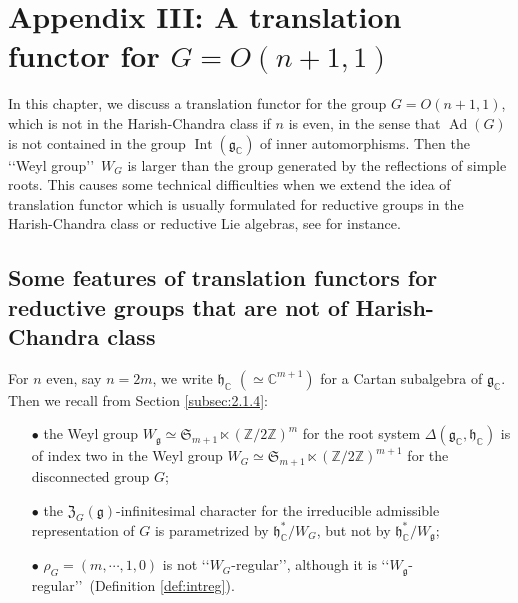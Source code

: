 \newpage
\section{Appendix III: A translation functor for $G=O(n+1,1)$}
\label{sec:Translation}

In this chapter,
 we discuss a translation functor 
 for the group $G=O(n+1,1)$, 
 which is not in the Harish-Chandra class
 if $n$ is even, 
 in the sense that $\operatorname{Ad}(G)$ is not contained 
 in the group $\operatorname{Int}({\mathfrak{g}}_{\mathbb{C}})$
 of inner automorphisms.  
Then the \lq\lq{Weyl group}\rq\rq\
 $W_G$ is larger
 than the group generated 
 by the reflections of simple roots.  
This causes some technical difficulties
 when we extend the idea of translation functor
 which is usually formulated 
 for reductive groups
 in the Harish-Chandra class or reductive Lie algebras, 
 see \cite{Jantzen, SpehVogan, Vogan81, Zuckerman} for instance.  

\subsection{Some features of translation functors
 for reductive groups
 that are not of Harish-Chandra class}
For $n$ even, 
say $n=2m$, 
 we write ${\mathfrak{h}}_{\mathbb{C}}$
 $(\simeq {\mathbb{C}}^{m+1})$
 for a Cartan subalgebra of ${\mathfrak{g}}_{\mathbb{C}}$.  
Then we recall from Section \ref{subsec:2.1.4}:
\begin{enumerate}
\item[$\bullet$]
the Weyl group $W_{\mathfrak{g}} \simeq {\mathfrak{S}}_{m+1} \ltimes ({\mathbb{Z}}/2{\mathbb{Z}})^{m}$ for the root system
 $\Delta({\mathfrak{g}}_{\mathbb{C}}, {\mathfrak{h}}_{\mathbb{C}})$
 is of index two in the Weyl group 
$W_G\simeq {\mathfrak{S}}_{m+1} \ltimes ({\mathbb{Z}}/2{\mathbb{Z}})^{m+1}$
 for the disconnected group $G$;
\item[$\bullet$]
the ${\mathfrak{Z}}_G({\mathfrak{g}})$-infinitesimal character
 for the irreducible admissible representation of $G$
 is parametrized by ${\mathfrak{h}}_{\mathbb{C}}^{\ast}/W_G$,
 but not by ${\mathfrak{h}}_{\mathbb{C}}^{\ast}/W_{\mathfrak{g}}$;
\item[$\bullet$]
$\rho_G=(m,\cdots,1,0)$ is not 
 \lq\lq{$W_G$-regular}\rq\rq, 
 although it is \lq\lq{$W_{\mathfrak{g}}$-regular}\rq\rq\
 (Definition \ref{def:intreg}).  
\end{enumerate}

